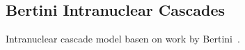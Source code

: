 



\subsection{Bertini Intranuclear Cascades}

Intranuclear cascade  model basen on work by Bertini~\cite{iljinov94}.



